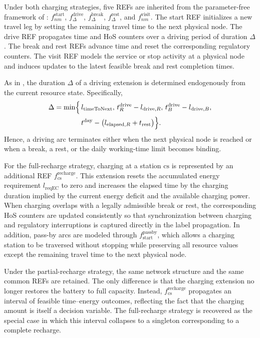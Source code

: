 \documentclass[3p,11pt,authoryear]{elsarticle}  %
\begin{document}
Under both charging strategies, five REFs are inherited from the parameter-free framework of \citet{goel2017exact}: \(f^{\text{start}}_{nm}\), \(f^{\text{drive}}_{\Delta}\), \(f^{\text{break}}_{\Delta}\), \(f^{\text{rest}}_{\Delta}\), and \(f^{\text{visit}}_{nm}\). The start REF initializes a new travel leg by setting the remaining travel time to the next physical node. The drive REF propagates time and HoS counters over a driving period of duration \(\Delta\). The break and rest REFs advance time and reset the corresponding regulatory counters. The visit REF models the service or stop activity at a physical node and induces updates to the latest feasible break and rest completion times.

As in \citet{goel2017exact}, the duration \(\Delta\) of a driving extension is determined endogenously from the current resource state. Specifically,
\[
\begin{aligned}
\Delta = \min\Bigl\{\, &
l_{\text{timeToNext}},\,
t_{R}^{\text{drive}} - l_{\text{drive},R},\,
t_{B}^{\text{drive}} - l_{\text{drive},B},\\
&
t^{\text{day}} - \bigl(l_{\text{elapsed},R} + t_{\text{rest}}\bigr)
\Bigr\}.
\end{aligned}
\]
Hence, a driving arc terminates either when the next physical node is reached or when a break, a rest, or the daily working-time limit becomes binding.

For the full-recharge strategy, charging at a station \(\mathrm{cs}\) is represented by an additional REF \(f^{\text{recharge}}_{\mathrm{cs}}\). This extension resets the accumulated energy requirement \(l_{\text{reqEC}}\) to zero and increases the elapsed time by the charging duration implied by the current energy deficit and the available charging power. When charging overlaps with a legally admissible break or rest, the corresponding HoS counters are updated consistently so that synchronization between charging and regulatory interruptions is captured directly in the label propagation. In addition, pass-by arcs are modeled through \(f^{\text{passby}}_{\text{start}}\), which allows a charging station to be traversed without stopping while preserving all resource values except the remaining travel time to the next physical node.

Under the partial-recharge strategy, the same network structure and the same common REFs are retained. The only difference is that the charging extension no longer restores the battery to full capacity. Instead, \(f^{\text{recharge}}_{\mathrm{cs}}\) propagates an interval of feasible time--energy outcomes, reflecting the fact that the charging amount is itself a decision variable. The full-recharge strategy is recovered as the special case in which this interval collapses to a singleton corresponding to a complete recharge.
\end{document}
